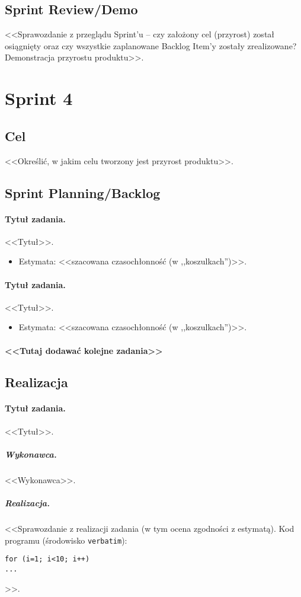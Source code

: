 \documentclass[a4paper]{article}
\begin{document}
\subsection{Sprint Review/Demo}
<<Sprawozdanie z przeglądu Sprint'u -- czy założony cel (przyrost) został osiągnięty oraz czy wszystkie zaplanowane Backlog Item'y zostały zrealizowane? Demonstracja przyrostu produktu>>.

\section{Sprint 4}

\subsection{Cel} <<Określić, w jakim celu tworzony jest przyrost produktu>>.

\subsection{Sprint Planning/Backlog}

\paragraph{Tytuł zadania.} <<Tytuł>>.
\begin{itemize}
	\item Estymata: <<szacowana czasochłonność (w ,,koszulkach'')>>.
\end{itemize}

\paragraph{Tytuł zadania.} <<Tytuł>>.
\begin{itemize}
	\item Estymata: <<szacowana czasochłonność (w ,,koszulkach'')>>.
\end{itemize}

\paragraph{<<Tutaj dodawać kolejne zadania>>}

\subsection{Realizacja}

\paragraph{Tytuł zadania.} <<Tytuł>>.
\subparagraph{Wykonawca.} <<Wykonawca>>.
\subparagraph{Realizacja.} <<Sprawozdanie z realizacji zadania (w tym ocena zgodności z estymatą). Kod programu (środowisko \texttt{verbatim}): \begin{verbatim}
for (i=1; i<10; i++)
...
\end{verbatim}>>.
\end{document}
